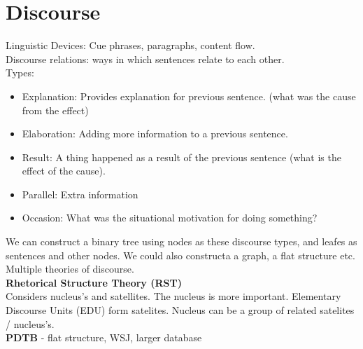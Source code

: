 \documentclass[]{article}
\begin{document}
	\section{Discourse}
	Linguistic Devices: Cue phrases, paragraphs, content flow. \\
	Discourse relations: ways in which sentences relate to each other. \\
	Types: 
	\begin{itemize}
	 \item Explanation: Provides explanation for previous sentence. (what was the cause from the effect)
	 \item Elaboration: Adding more information to a previous sentence. 
	 \item Result: A thing happened as a result of the previous sentence (what is the effect of the cause).
	 \item Parallel: Extra information  
	 \item Occasion: What was the situational motivation for doing something?
	\end{itemize}
	
	We can construct a binary tree using nodes as these discourse types, and leafes as sentences and other nodes. We could also constructa a graph, a flat structure etc. Multiple theories of discourse. \\
	
	\textbf{Rhetorical Structure Theory (RST)} \\
	Considers nucleus's and satellites. The nucleus is more important.
	Elementary Discourse Units (EDU) form satelites. Nucleus can be a group of related satelites / nucleus's. \\ 
	
	\textbf{PDTB} - flat structure, WSJ, larger database

	
	
	\clearpage
	
	
	
\end{document}
